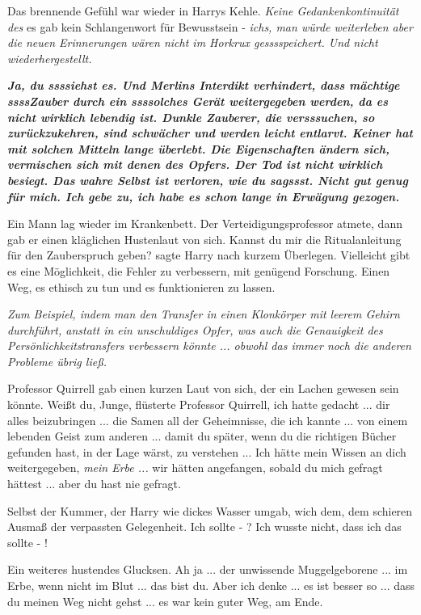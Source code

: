 Das brennende Gefühl war wieder in Harrys Kehle. \glqq{}\emph{Keine
Gedankenkontinuität des} \glqq{} es gab kein Schlangenwort für Bewusstsein \glqq{}
-\emph{ ichs, man würde weiterleben aber die neuen Erinnerungen wären nicht im
Horkrux gesssspeichert. Und nicht wiederhergestellt.}\grqq{}

\glqq{}\textbf{\emph{Ja, du ssssiehst es. Und Merlins Interdikt verhindert, dass
mächtige ssssZauber durch ein ssssolches Gerät weitergegeben werden, da es nicht
wirklich lebendig ist. Dunkle Zauberer, die versssuchen, so zurückzukehren, sind
schwächer und werden leicht entlarvt. Keiner hat mit solchen Mitteln lange
überlebt. Die Eigenschaften ändern sich, vermischen sich mit denen des Opfers.
Der Tod ist nicht wirklich besiegt. Das wahre Selbst ist verloren, wie du
sagssst. Nicht gut genug für mich. Ich gebe zu, ich habe es schon lange in
Erwägung gezogen.}}\grqq{}

Ein Mann lag wieder im Krankenbett. Der Verteidigungsprofessor atmete, dann gab
er einen kläglichen Hustenlaut von sich. \glqq{}Kannst du mir die Ritualanleitung
für den Zauberspruch geben?\grqq{} sagte Harry nach kurzem Überlegen. \glqq{}
Vielleicht gibt es eine Möglichkeit, die Fehler zu verbessern, mit genügend
Forschung. Einen Weg, es ethisch zu tun und es funktionieren zu lassen.\grqq{}

\emph{Zum Beispiel, indem man den Transfer in einen Klonkörper mit leerem Gehirn
durchführt, anstatt in ein unschuldiges Opfer, was auch die Genauigkeit des
Persönlichkeitstransfers verbessern könnte ... obwohl das immer noch die anderen
Probleme übrig ließ.}

Professor Quirrell gab einen kurzen Laut von sich, der ein Lachen gewesen sein
könnte. \glqq{}Weißt du, Junge\grqq{}, flüsterte Professor Quirrell, \glqq{}ich
hatte gedacht ... dir alles beizubringen ... die Samen all der Geheimnisse, die
ich kannte ... von einem lebenden Geist zum anderen ... damit du später, wenn du
die richtigen Bücher gefunden hast, in der Lage wärst, zu verstehen ... Ich hätte
mein Wissen an dich weitergegeben, \emph{mein Erbe ...} wir hätten angefangen,
sobald du mich gefragt hättest ... aber du hast nie gefragt.\grqq{}

Selbst der Kummer, der Harry wie dickes Wasser umgab, wich dem, dem schieren
Ausmaß der verpassten Gelegenheit. \glqq{}Ich sollte - ? Ich wusste nicht, dass
ich das sollte - !\grqq{}

Ein weiteres hustendes Glucksen. \glqq{}Ah ja ... der unwissende Muggelgeborene ...
im Erbe, wenn nicht im Blut ... das bist du. Aber ich denke ... es ist besser
so ... dass du meinen Weg nicht gehst ... es war kein guter Weg, am Ende.\grqq{}

